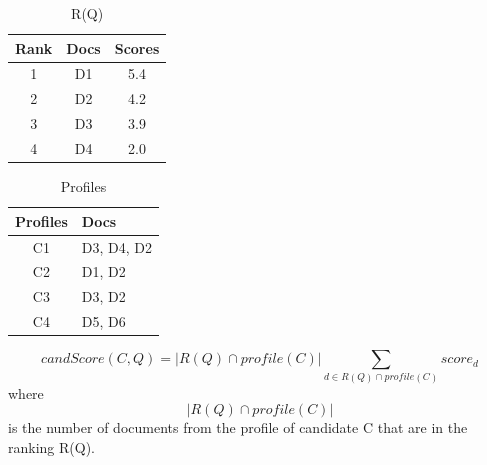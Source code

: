 \begin{table}
\centering
\begin{tabular}{|c|c|c|}
\hline \textbf{Rank} & \textbf{Docs} & \textbf{Scores}\\
\hline 1 & D1 & 5.4 \\
\hline 2 & D2 & 4.2\\
\hline 3 & D3 & 3.9 \\
\hline 4 & D4 & 2.0 \\  
\hline
\end{tabular}
\caption{R(Q)} \label{table:ranking}
\end{table}
\quad
\begin{table}
\centering
\begin{tabular}{|c|l|}
\hline \textbf{Profiles} & \textbf{Docs}\\
\hline C1 & D3, D4, D2 \\
\hline C2 & D1, D2 \\
\hline C3 & D3, D2 \\
\hline C4 & D5, D6 \\  
\hline
\end{tabular}
\caption{Profiles} \label{table:profiles}
\end{table}

\[
candScore(C,Q) = |R(Q) \cap profile(C)| \sum_{d \in R(Q) \cap profile(C)} score_d
\]
where \[|R(Q) \cap profile(C)|\] is the number of documents from the profile of candidate C that are in the ranking R(Q).














